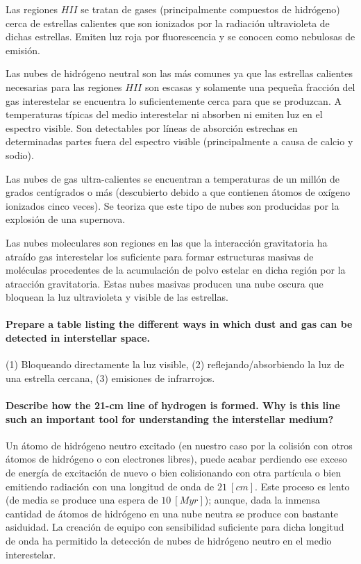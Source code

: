 \documentclass{tufte-handout}
\begin{document}
Las regiones $HII$ se tratan de gases (principalmente compuestos de hidrógeno) cerca de estrellas calientes que son ionizados por la radiación ultravioleta de dichas estrellas. Emiten luz roja por fluorescencia y se conocen como nebulosas de emisión.

Las nubes de hidrógeno neutral son las más comunes ya que las estrellas calientes necesarias para las regiones $HII$ son escasas y solamente una pequeña fracción del gas interestelar se encuentra lo suficientemente cerca para que se produzcan. A temperaturas típicas del medio interestelar ni absorben ni emiten luz en el espectro visible. Son detectables por líneas de absorción estrechas en determinadas partes fuera del espectro visible (principalmente a causa de calcio y sodio).

Las nubes de gas ultra-calientes se encuentran a temperaturas de un millón de grados centígrados o más (descubierto debido a que contienen átomos de oxígeno ionizados cinco veces). Se teoriza que este tipo de nubes son producidas por la explosión de una supernova.

Las nubes moleculares son regiones en las que la interacción gravitatoria ha atraído gas interestelar los suficiente para formar estructuras masivas de moléculas procedentes de la acumulación de polvo estelar en dicha región por la atracción gravitatoria. Estas nubes masivas producen una nube oscura que bloquean la luz ultravioleta y visible de las estrellas.

\paragraph{\textbf{Prepare a table listing the different ways in which dust and gas can be detected in interstellar space.}}

(1) Bloqueando directamente la luz visible, (2) reflejando/absorbiendo la luz de una estrella cercana, (3) emisiones de infrarrojos.

\paragraph{\textbf{Describe how the 21-cm line of hydrogen is formed. Why is this line such an important tool for
understanding the interstellar medium?}}

Un átomo de hidrógeno neutro excitado (en nuestro caso por la colisión con otros átomos de hidrógeno o con electrones libres), puede acabar perdiendo ese exceso de energía de excitación de nuevo o bien colisionando con otra partícula o bien emitiendo radiación con una longitud de onda de $21~[cm]$. Este proceso es lento (de media se produce una espera de $10~[Myr]$); aunque, dada la inmensa cantidad de átomos de hidrógeno en una nube neutra se produce con bastante asiduidad. La creación de equipo con sensibilidad suficiente para dicha longitud de onda ha permitido la detección de nubes de hidrógeno neutro en el medio interestelar.
\end{document}
